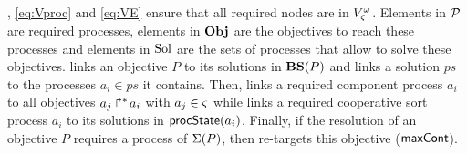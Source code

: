 , \eqref{eq:Vproc} and \eqref{eq:VE} ensure that all required nodes are in $V_\varsigma^\omega$.
Elements in $\mathcal{P}$ are required processes,
elements in $\mathbf{Obj}$ are the objectives to reach these processes
and elements in $\mathrm{Sol}$ are the sets of processes that allow to solve these objectives.
 links an objective $P$ to its solutions in $\mathbf{BS}(P)$
and  links a solution $ps$ to the processes $a_i \in ps$ it contains.
Then,  links a required component process $a_i$ to all objectives $\mbox{${a}_{j}\Rsh^*\!{a}_{i}$}$ with $a_j \in \varsigma$
while  links a required cooperative sort process $a_i$ to its solutions in $\mathsf{procState}(a_i)$.
Finally, if the resolution of an objective $P$ requires a process of $\Sigma(P)$, then  re-targets this objective ($\mathsf{maxCont}$).

%
